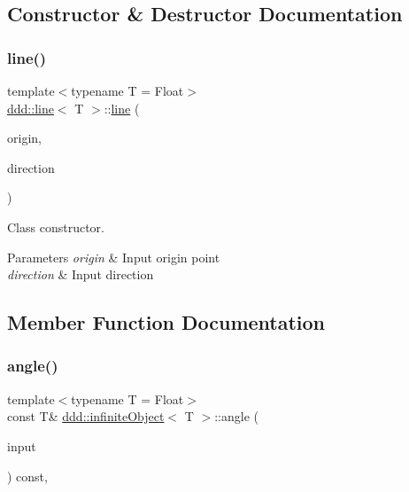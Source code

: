 \subsection{Constructor \& Destructor Documentation}
\mbox{\label{classddd_1_1line_a8499fa13ffea06de1705c05f742e0f5c}} 
\subsubsection{\texorpdfstring{line()}{line()}}
{\footnotesize\ttfamily template$<$typename T = Float$>$ \\
\hyperlink{classddd_1_1line}{ddd\+::line}$<$ T $>$\+::\hyperlink{classddd_1_1line}{line} (\begin{DoxyParamCaption}\item[{const \hyperlink{classddd_1_1point}{point}$<$ T $>$ \&}]{origin,  }\item[{const \hyperlink{classddd_1_1vector}{vector}$<$ T $>$ \&}]{direction }\end{DoxyParamCaption})\hspace{0.3cm}{\ttfamily [inline]}}



Class constructor. 


\begin{DoxyParams}{Parameters}
{\em origin} & Input origin point \\
\hline
{\em direction} & Input direction \\
\hline
\end{DoxyParams}


\subsection{Member Function Documentation}
\mbox{\label{classddd_1_1infinite_object_a2145eca21c4505c11d19badc25faaf85}} 
\subsubsection{\texorpdfstring{angle()}{angle()}}
{\footnotesize\ttfamily template$<$typename T = Float$>$ \\
const T\& \hyperlink{classddd_1_1infinite_object}{ddd\+::infinite\+Object}$<$ T $>$\+::angle (\begin{DoxyParamCaption}\item[{const \hyperlink{classddd_1_1infinite_object}{infinite\+Object}$<$ T $>$ \&}]{input }\end{DoxyParamCaption}) const\hspace{0.3cm}{\ttfamily [inline]}, {\ttfamily [inherited]}}



